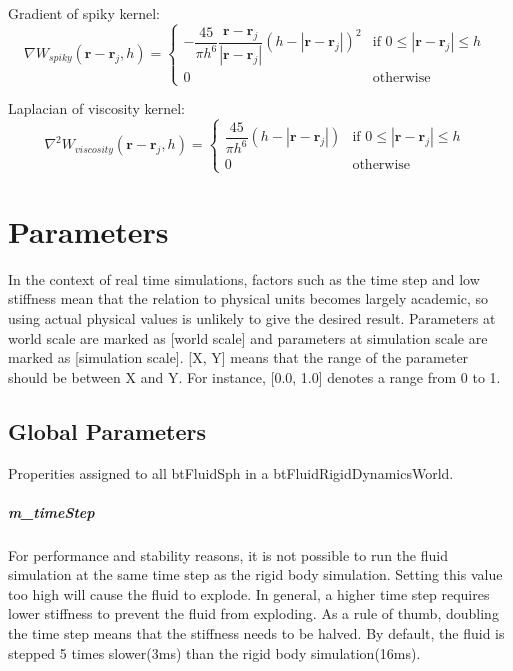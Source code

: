 \documentclass[]{article}
\begin{document}
	Gradient of spiky kernel:
	\begin{equation}
		\nabla W_{spiky}(\mathbf{r} - \mathbf{r}_j, h) =  
				\left \{ 
					\begin{array}{ll}
						- \dfrac{45}{\pi h^6}  \dfrac{\mathbf{r} - \mathbf{r}_j}{|\mathbf{r} - \mathbf{r}_j|} 
							(h - |\mathbf{r} - \mathbf{r}_j|)^2 
							& \textrm{if \(0 \leq |\mathbf{r} - \mathbf{r}_j| \leq h\) } \\[1em]
						0 & \textrm{otherwise} 
					\end{array}
				\right.
	\end{equation}
	
	Laplacian of viscosity kernel:
	\begin{equation}
		\nabla ^ 2 W_{viscosity}(\mathbf{r} - \mathbf{r}_j, h) =  
						\left \{ 
							\begin{array}{ll}
								\dfrac{45}{\pi h^6} (h - |\mathbf{r} - \mathbf{r}_j|)
									& \textrm{if \(0 \leq |\mathbf{r} - \mathbf{r}_j| \leq h\) } \\[1em]
								0 & \textrm{otherwise} 
							\end{array}
						\right.
	\end{equation}
	
\pagebreak
\section{Parameters}
	In the context of real time simulations, factors such as the time step and low stiffness mean that the relation to
	physical units becomes largely academic, so using actual physical values is unlikely to give the desired result. 
	Parameters at world scale are marked as [world scale] and parameters at simulation scale are marked as 
	[simulation scale]. [X, Y] means that the range of the parameter should be between X and Y. For instance, [0.0, 1.0]
	denotes a range from 0 to 1.
	
	\subsection{Global Parameters}
		Properities assigned to all btFluidSph in a btFluidRigidDynamicsWorld.
	
		\subparagraph{m\_timeStep}
			For performance and stability reasons, it is not possible to run the fluid simulation at the same time step as 
			the rigid body simulation. Setting this value too high will cause the fluid to explode. In general, a higher 
			time step requires lower stiffness to prevent the fluid from exploding. As a rule of thumb, doubling the time step
			means that the stiffness needs to be halved. By default, the fluid is stepped 5 times slower(3ms) than the rigid body simulation(16ms).
		
\end{document}
